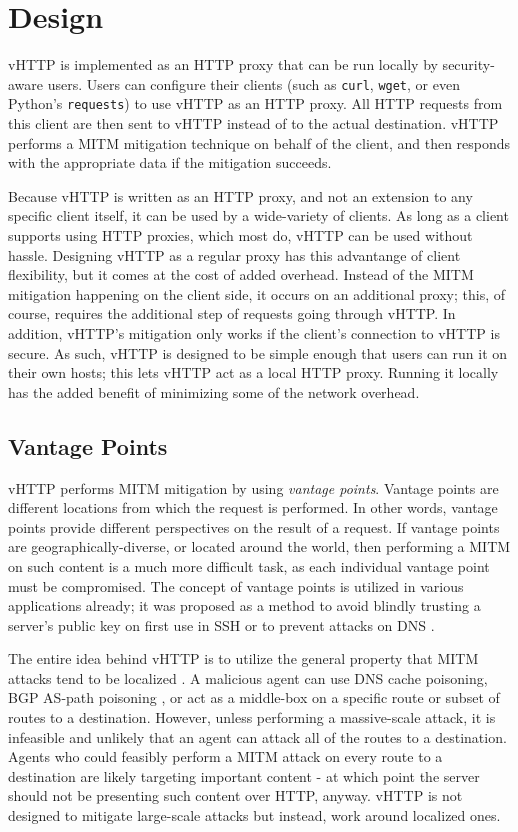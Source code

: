 \section{Design}
\label{sec:design}

vHTTP is implemented as an HTTP proxy that can be run locally by security-aware
users. Users can configure their clients (such as \texttt{curl},
\texttt{wget}, or even Python's \texttt{requests}) to use vHTTP as an HTTP
proxy. All HTTP requests from this client are then sent to vHTTP instead of
to the actual destination. vHTTP performs a MITM mitigation technique on
behalf of the client, and then responds with the appropriate data if the
mitigation succeeds.

Because vHTTP is written as an HTTP proxy, and not an extension to any specific
client itself, it can be used by a wide-variety of clients. As long as a client
supports using HTTP proxies, which most do, vHTTP can be used without hassle.
Designing vHTTP as a regular proxy has this advantange of client flexibility,
but it comes at the cost of added overhead. Instead of the MITM mitigation
happening on the client side, it occurs on an additional proxy; this,
of course, requires the additional step of requests going through vHTTP. In
addition, vHTTP's mitigation only works if the client's connection to vHTTP
is secure. As such, vHTTP is designed to be simple enough that users can run
it on their own hosts; this lets vHTTP act as a local HTTP proxy. Running it
locally has the added benefit of minimizing some of the network overhead.

\subsection{Vantage Points}

vHTTP performs MITM mitigation by using \textit{vantage points}. Vantage points
are different locations from which the request is performed. In other words,
vantage points provide different perspectives on the result of a request. If
vantage points are geographically-diverse, or located around the world, then
performing a MITM on such content is a much more difficult task, as each
individual vantage point must be compromised. The concept of vantage points
is utilized in various applications already; it was proposed as a method to
avoid blindly trusting a server's public key on first use in SSH
\cite{Perspectives} or to prevent attacks on DNS \cite{Hotpets17, ConfiDNS}.

The entire idea behind vHTTP is to utilize the general property that MITM
attacks tend to be localized \cite{MITM-Survey}. A malicious agent can use DNS
cache poisoning, BGP AS-path poisoning \cite{Hotpets17}, or act as a
middle-box on a specific route or subset of routes to a destination. However,
unless performing a massive-scale attack, it is infeasible and unlikely that
an agent can attack all of the routes to a destination. Agents who could
feasibly perform a MITM attack on every route to a destination are likely
targeting important content - at which point the server should not be
presenting such content over HTTP, anyway. vHTTP is not designed to mitigate
large-scale attacks but instead, work around localized ones.

